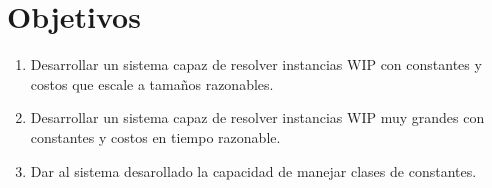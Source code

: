 \section{Objetivos}

\begin{enumerate}
\item Desarrollar un sistema capaz de resolver instancias WIP con constantes y
costos que escale a tamaños razonables.
\item Desarrollar un sistema capaz de resolver instancias WIP muy grandes con
constantes y costos en tiempo razonable.
\item Dar al sistema desarollado la capacidad de manejar clases de constantes.
\end{enumerate}
